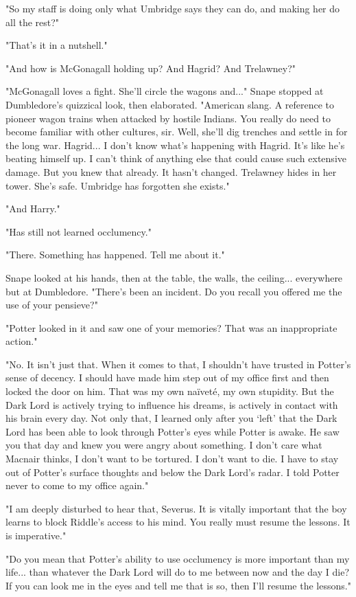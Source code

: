 \documentclass[a4paper,11pt]{article}
\begin{document}
"So my staff is doing only what Umbridge says they can do, and making her do all the rest?"

"That's it in a nutshell."

"And how is McGonagall holding up? And Hagrid? And Trelawney?"

"McGonagall loves a fight. She'll circle the wagons and..." Snape stopped at Dumbledore's quizzical look, then elaborated. "American slang. A reference to pioneer wagon trains when attacked by hostile Indians. You really do need to become familiar with other cultures, sir. Well, she'll dig trenches and settle in for the long war. Hagrid... I don't know what's happening with Hagrid. It's like he's beating himself up. I can't think of anything else that could cause such extensive damage. But you knew that already. It hasn't changed. Trelawney hides in her tower. She's safe. Umbridge has forgotten she exists."

"And Harry."

"Has still not learned occlumency."

"There. Something has happened. Tell me about it."

Snape looked at his hands, then at the table, the walls, the ceiling... everywhere but at Dumbledore. "There's been an incident. Do you recall you offered me the use of your pensieve?"

"Potter looked in it and saw one of your memories? That was an inappropriate action."

"No. It isn't just that. When it comes to that, I shouldn't have trusted in Potter's sense of decency. I should have made him step out of my office first and then locked the door on him. That was my own naïveté, my own stupidity. But the Dark Lord is actively trying to influence his dreams, is actively in contact with his brain every day. Not only that, I learned only after you `left' that the Dark Lord has been able to look through Potter's eyes while Potter is awake. He saw you that day and knew you were angry about something. I don't care what Macnair thinks, I don't want to be tortured. I don't want to die. I have to stay out of Potter's surface thoughts and below the Dark Lord's radar. I told Potter never to come to my office again."

"I am deeply disturbed to hear that, Severus. It is vitally important that the boy learns to block Riddle's access to his mind. You really must resume the lessons. It is imperative."

"Do you mean that Potter's ability to use occlumency is more important than my life... than whatever the Dark Lord will do to me between now and the day I die? If you can look me in the eyes and tell me that is so, then I'll resume the lessons."
\end{document}
